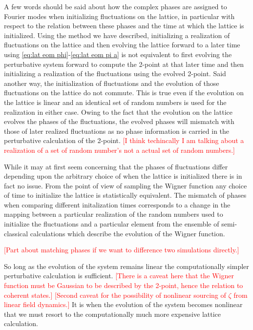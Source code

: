 A few words should be said about how the complex phases are assigned to Fourier modes when initializing fluctuations on the lattice, in particular with respect to the relation between these phases and the time at which the lattice is initialized.
Using the method we have described, initializing a realization of fluctuations on the lattice and then evolving the lattice forward to a later time using \eqref{eq:lat eom phi}-\eqref{eq:lat eom pi a} is not equivalent to first evolving the perturbative system forward to compute the 2-point at that later time and then initializing a realization of the fluctuations using the evolved 2-point.
Said another way, the initialization of fluctuations and the evolution of those fluctuations on the lattice do not commute.
This is true even if the evolution on the lattice is linear and an identical set of random numbers is used for the realization in either case.
Owing to the fact that the evolution on the lattice evolves the phases of the fluctuations, the evolved phases will mismatch with those of later realized fluctuations as no phase information is carried in the perturbative calculation of the 2-point. 
\textcolor{red}{[I think techincally I am talking about a realization of a set of random number's not a actual set of random numbers.]}

While it may at first seem concerning that the phases of fluctuations differ depending upon the arbitrary choice of when the lattice is initialized there is in fact no issue.
From the point of view of sampling the Wigner function any choice of time to initialize the lattice is statistically equivalent. The mismatch of phases when comparing different initalization times corresponds to a change in the mapping between a particular realization of the random numbers used to initialize the fluctuations and a particular element from the ensemble of semi-classical calculations which describe the evolution of the Wigner function.


\textcolor{red}{[Part about matching phases if we want to difference two simulations directly.]}

So long as the evolution of the system remains linear the computationally simpler perturbative calculation is sufficient.
\textcolor{red}{[There is a caveat here that the Wigner function must be Gaussian to be described by the 2-point, hence the relation to coherent states.]}
\textcolor{red}{[Second caveat for the possibility of nonlinear sourcing of $\zeta$ from linear field dynamics.]}
It is when the evolution of the system becomes nonlinear that we must resort to the computationally much more expensive lattice calculation.

